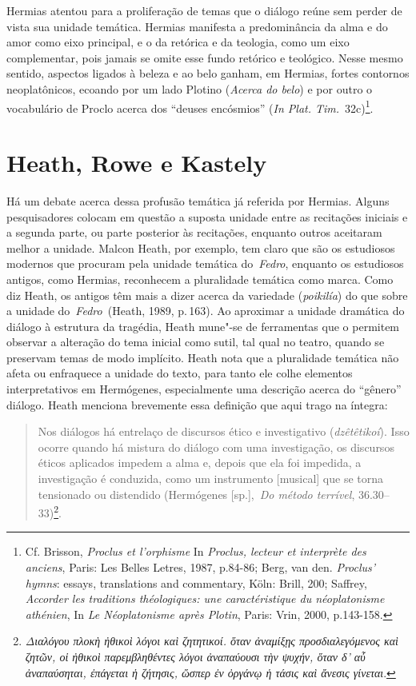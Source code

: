 Hermias atentou para a proliferação de temas que o diálogo reúne sem
perder de vista sua unidade temática. Hermias manifesta a predominância
da alma e do amor como eixo principal, e o da retórica e da teologia,
como um eixo complementar, pois jamais se omite esse fundo retórico e
teológico. Nesse mesmo sentido, aspectos ligados à beleza e ao belo
ganham, em Hermias, fortes contornos neoplatônicos, ecoando por um lado
Plotino (\emph{Acerca do belo}) e por outro o vocabulário de Proclo
acerca dos ``deuses encósmios'' (\emph{In Plat. Tim.}~32c)\footnote{Cf.
  Brisson,  \emph{Proclus et l'orphisme} In \emph{Proclus, lecteur et
  interprète des anciens}, Paris: Les Belles Letres, 1987, p.84-86;
  Berg,  van den. \emph{Proclus' hymns}: essays, translations and
  commentary, Köln: Brill, 200; Saffrey,  \emph{Accorder les
  traditions théologiques: une caractéristique du néoplatonisme
  athénien}, In \emph{Le Néoplatonisme après Plotin}, Paris: Vrin, 2000,
  p.143-158.}.

 

\section{Heath, Rowe e Kastely}

 

Há um debate acerca dessa profusão temática já referida por Hermias.
Alguns pesquisadores colocam em questão a suposta unidade entre as
recitações iniciais e a segunda parte, ou parte posterior às recitações,
enquanto outros aceitaram melhor a unidade. Malcon Heath, por exemplo,
tem claro que são os estudiosos modernos que procuram pela unidade
temática do~\emph{Fedro}, enquanto os estudiosos antigos, como Hermias,
reconhecem a pluralidade temática como marca. Como diz Heath, os antigos
têm mais a dizer acerca da variedade (\emph{poikilía}) do que sobre a 
unidade do~\emph{Fedro~}(Heath, 1989, p.\,163). Ao aproximar a unidade
dramática do diálogo à estrutura da tragédia, Heath mune"-se de
ferramentas que o permitem observar a alteração do tema inicial como
sutil, tal qual no teatro, quando se preservam temas de modo implícito.
Heath nota que a pluralidade temática não afeta ou enfraquece a unidade
do texto, para tanto ele colhe elementos interpretativos em Hermógenes,
especialmente uma descrição acerca do ``gênero'' diálogo. Heath menciona
brevemente essa definição que aqui trago na íntegra:

 

\begin{quote}
Nos diálogos há entrelaço de discursos ético e investigativo
(\emph{dzêtêtikoí}). Isso ocorre quando há mistura do diálogo com uma
investigação, os discursos éticos aplicados impedem a alma e, depois que
ela foi impedida, a investigação é conduzida, como um instrumento
[musical] que se torna tensionado ou distendido (Hermógenes
[sp.],~\emph{Do método terrível}, 36.30--33)\footnote{\emph{Διαλόγου πλοκὴ
  ἠθικοὶ λόγοι καὶ ζητητικοί. ὅταν ἀναμίξῃς προσδιαλεγόμενος καὶ ζητῶν,
  οἱ ἠθικοὶ παρεμβληθέντες λόγοι ἀναπαύουσι τὴν ψυχήν, ὅταν δ' αὖ
  ἀναπαύσηται, ἐπάγεται ἡ ζήτησις, ὥσπερ ἐν ὀργάνῳ ἡ τάσις καὶ ἄνεσις
  γίνεται}.}.
\end{quote}

